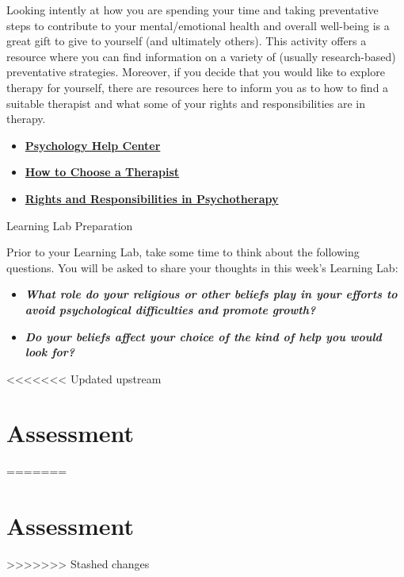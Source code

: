 \documentclass[
]{book}
\begin{document}
\begin{reflect}
Looking intently at how you are spending your time and taking preventative steps to contribute to your mental/emotional health and overall well-being is a great gift to give to yourself (and ultimately others). This activity offers a resource where you can find information on a variety of (usually research-based) preventative strategies. Moreover, if you decide that you would like to explore therapy for yourself, there are resources here to inform you as to how to find a suitable therapist and what some of your rights and responsibilities are in therapy.

\begin{itemize}
\item
  \href{https://www.apa.org/helpcenter/}{\textbf{Psychology Help Center}}
\item
  \href{http://psychcentral.com/therapst.htm}{\textbf{How to Choose a Therapist}}
\item
  \href{Rights-and-Responsibilities-in-Psychotherapy.pdf}{\textbf{Rights and Responsibilities in Psychotherapy}}
\end{itemize}

{Learning Lab Preparation}

Prior to your Learning Lab, take some time to think about the following questions. You will be asked to share your thoughts in this week's Learning Lab:

\begin{itemize}
\item
  \textbf{\emph{What role do your religious or other beliefs play in your efforts to avoid psychological difficulties and promote growth?}}
\item
  \textbf{\emph{Do your beliefs affect your choice of the kind of help you would look for?}}
\end{itemize}
\end{reflect}

<<<<<<< Updated upstream
\hypertarget{assessment-12}{%
\section*{Assessment}\label{assessment-12}}
=======
\hypertarget{assessment-11}{%
\section*{Assessment}\label{assessment-11}}
>>>>>>> Stashed changes
\end{document}
